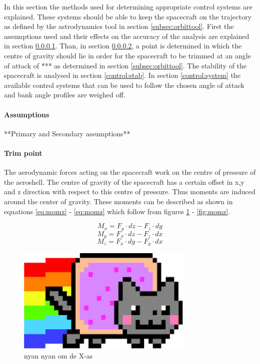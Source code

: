 In this section the methods used for determining appropriate control systems are explained. These systems should be able to keep the spacecraft on the trajectory as defined by the astrodynamics tool in section \ref{subsec:orbittool}. First the assumptions used and their effects on the accuracy of the analysis are explained in section \ref{control:assumptions}. Than, in section \ref{control:trim}, a point is determined in which the centre of gravity should lie in order for the spacecraft to be trimmed at an angle of attack of *** as determined in section  \ref{subsec:orbittool}. The stability of the spacecraft is analysed in section \ref{control:stab}. In section \ref{control:system} the available control systems that can be used to follow the chosen angle of attack and bank angle profiles are weighed off.

\paragraph{Assumptions}
\label{control:assumptions}
**Primary and Secondary assumptions**

\paragraph{Trim point}
\label{control:trim}
The aerodynamic forces acting on the spacecraft work on the centre of pressure of the aeroshell. The centre of gravity of the spacecraft has a certain offset in x,y and z direction with respect to this centre of pressure. Thus moments are induced around the center of gravity. These moments can be described as shown in equations \ref{eq:momx} - \ref{eq:momz} which follow from figures \ref{fig:momx} - \ref{fig:momz}.

\begin{equation}
\label{eq:momx}
M_x = F_y \cdot dz - F_z \cdot dy
\end{equation}
\begin{equation}
\label{eq:momy}
M_y = F_x \cdot dz - F_z \cdot dx
\end{equation}
\begin{equation}
\label{eq:momz}
M_z = F_x \cdot dy - F_y \cdot dx
\end{equation}

\begin{figure}
	\centering
	\includegraphics[width=0.75\textwidth]{./Figure/Nyan}
	\caption{nyan nyan om de X-as}
	\label{fig:momx}
\end{figure}

